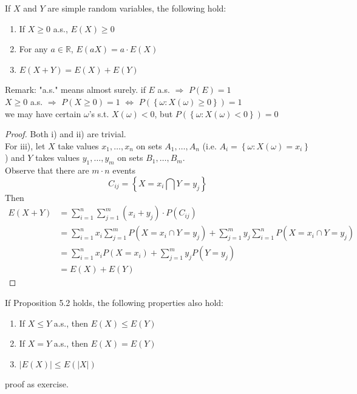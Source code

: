\begin{reqproof}
\begin{proposition}
    If $X$ and $Y$ are simple random variables, the following hold:
    \begin{enumerate}[label = \roman*)]
        \item If $X\geq 0$ a.s., $E(X) \geq 0$
        \item For any $a \in \mathbb{R}$, $E(aX) = a \cdot E(X)$
        \item $E(X+Y) = E(X)+E(Y)$
    \end{enumerate}
    Remark: "a.s." means almost surely.
    if $E$ a.s. $\Rightarrow$ $P(E) = 1$
    \\  $X \geq 0$ a.s. $\Rightarrow$ $P(X \geq 0) = 1$ $\Leftrightarrow$ $P(\left\{\omega: X(\omega) \geq 0\right\})=1$
    \\we may have certain $\omega$'s s.t. $X(\omega) < 0$, but $P(\left\{\omega: X(\omega) < 0\right\}) = 0$
\end{proposition}

\begin{proof}
Both i) and ii) are trivial.
\\For iii), let $X$ take values $x_1, \dots, x_n$ on sets $A_1,\dots, A_n$ (i.e. $A_i = \left\{\omega: X(\omega) = x_i\right\}$) and $Y$ takes values $y_1, \dots, y_m$ on sets $B_1, \dots, B_m$.
\\Observe that there are $m\cdot n$ events
\[C_{ij} = \left\{X = x_i \bigcap Y = y_j \right\}\]
Then
\begin{align*}
    E(X+Y) &= \sum_{i=1}^{n}\sum_{j=1}^{m} (x_i+y_j)\cdot P(C_{ij})\\
    &= \sum_{i=1}^{n}x_i \sum_{j=1}^{m} P(X=x_i \cap Y=y_j)+\sum_{j=1}^{m}y_j \sum_{i=1}^{n} P(X=x_i \cap Y=y_j)\\
    &= \sum_{i=1}^{n}x_i P(X=x_i)+\sum_{j=1}^{m}y_j P(Y=y_j)\\
    &= E(X)+E(Y)
\end{align*}
\end{proof}
\end{reqproof}

\begin{lemma}[][5.2.1]
    If Proposition 5.2 holds, the following properties also hold:
    \begin{enumerate}[label = \roman*), start=4]
        \item If $X \leq Y$ a.s., then $E(X) \leq E(Y)$
        \item If $X=Y$ a.s., then $E(X) = E(Y)$
        \item $\left|E(X)\right| \leq E(\left|X\right|)$
    \end{enumerate}
    proof as exercise.
\end{lemma}

